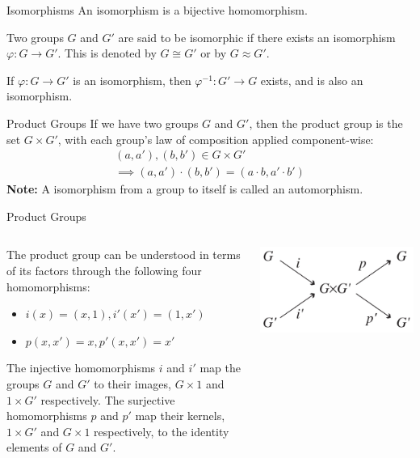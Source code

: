 \documentclass{beamer}
\begin{document}
\begin{frame}{Isomorphisms}
  An isomorphism is a bijective homomorphism.
  \begin{definition}
    Two groups $G$ and $G'$ are said to be isomorphic if there exists an isomorphism $\varphi: G \to G'$. This is denoted by $G \cong G'$ or by $G \approx G'$.
    \end{definition}
    \begin{lemma}
      If $\varphi: G \to G'$ is an isomorphism, then $\varphi^{-1}: G' \to G$ exists, and is also an isomorphism.
    \end{lemma}
\end{frame}
\begin{frame}{Product Groups}
  If we have two groups $G$ and $G'$, then the product group is the set $G \times G'$, with each group's law of composition applied component-wise:
  \begin{gather}
    (a, a'), (b, b') \in G \times G' \\
    \implies (a, a') \cdot (b, b') = (a \cdot b, a' \cdot b')
  \end{gather}
  \textbf{Note:} A isomorphism from a group to itself is called an automorphism.
\end{frame}
\begin{frame}{Product Groups}
  \begin{columns}
    \begin{column}{.65\textwidth}
      The product group can be understood in terms of its factors through the following four homomorphisms:
      \begin{itemize}
      \item $i(x) = (x, 1), i'(x') = (1, x')$
      \item $p(x, x') = x, p'(x, x') = x'$
      \end{itemize}
    The injective homomorphisms $i$ and $i'$ map the groups $G$ and $G'$ to their images, $G \times 1$ and $1 \times G'$ respectively.
    The surjective homomorphisms $p$ and $p'$ map their kernels, $1 \times G'$ and $G \times 1$ respectively, to the identity elements of $G$ and $G'$.
    \end{column}
    \begin{column}{.33\textwidth}
     \includegraphics[width=\linewidth]{group_product.jpeg} 
    \end{column}
      
  \end{columns}
\end{frame}
\end{document}
